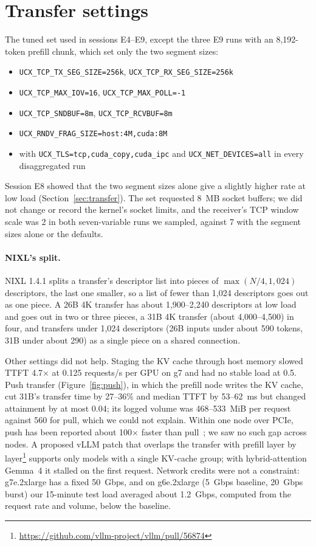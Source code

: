 \documentclass[11pt]{article}
\begin{document}
\section{Transfer settings}\label{app:ucx}
The tuned set used in sessions E4--E9, except the three E9 runs with an 8,192-token prefill chunk, which set only the two segment sizes:
{\small
\begin{itemize}
  \item \texttt{UCX\_TCP\_TX\_SEG\_SIZE=256k}, \texttt{UCX\_TCP\_RX\_SEG\_SIZE=256k}
  \item \texttt{UCX\_TCP\_MAX\_IOV=16}, \texttt{UCX\_TCP\_MAX\_POLL=-1}
  \item \texttt{UCX\_TCP\_SNDBUF=8m}, \texttt{UCX\_TCP\_RCVBUF=8m}
  \item \texttt{UCX\_RNDV\_FRAG\_SIZE=host:4M,cuda:8M}
  \item with \texttt{UCX\_TLS=tcp,cuda\_copy,cuda\_ipc} and \texttt{UCX\_NET\_DEVICES=all} in every disaggregated run
\end{itemize}}
Session E8 showed that the two segment sizes alone give a slightly higher rate at low load (Section~\ref{sec:transfer}). The set requested 8~MB socket buffers; we did not change or record the kernel's socket limits, and the receiver's TCP window scale was 2 in both seven-variable runs we sampled, against 7 with the segment sizes alone or the defaults.

\paragraph{NIXL's split.} NIXL 1.4.1 splits a transfer's descriptor list into pieces of $\max(N/4, 1{,}024)$ descriptors, the last one smaller, so a list of fewer than 1,024 descriptors goes out as one piece. A 26B 4K transfer has about 1,900--2,240 descriptors at low load and goes out in two or three pieces, a 31B 4K transfer (about 4,000--4,500) in four, and transfers under 1,024 descriptors (26B inputs under about 590 tokens, 31B under about 290) as a single piece on a shared connection.

Other settings did not help. Staging the KV cache through host memory slowed TTFT 4.7$\times$ at 0.125 requests/s per GPU on g7 and had no stable load at 0.5. Push transfer (Figure~\ref{fig:push}), in which the prefill node writes the KV cache, cut 31B's transfer time by 27--36\% and median TTFT by 53--62~ms but changed attainment by at most 0.04; its logged volume was 468--533~MiB per request against 560 for pull, which we could not explain. Within one node over PCIe, push has been reported about 100$\times$ faster than pull~\cite{vllm52607}; we saw no such gap across nodes. A proposed vLLM patch that overlaps the transfer with prefill layer by layer\footnote{\url{https://github.com/vllm-project/vllm/pull/56874}} supports only models with a single KV-cache group; with hybrid-attention Gemma~4 it stalled on the first request. Network credits were not a constraint: g7e.2xlarge has a fixed 50~Gbps, and on g6e.2xlarge (5~Gbps baseline, 20~Gbps burst) our 15-minute test load averaged about 1.2~Gbps, computed from the request rate and volume, below the baseline.
\end{document}
